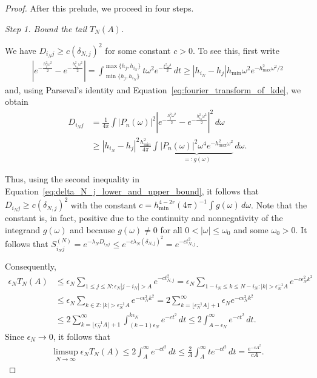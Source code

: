 \begin{proof}
    After this prelude, we proceed in four steps.

    \textit{Step 1. Bound the tail $T_N(A)$.}

    We have $D_{i_Nj}\ge c(\delta_{N,j})^2$ for some constant $c>0$. To see this, first write
    \begin{align*}
        \left|e^{-\frac{h_j^2\omega^2}{2}}-e^{-\frac{h_{i_N}^2\omega^2}{2}}\right|=\int_{\min\{h_j,h_{i_N}\}}^{\max\{h_j,h_{i_N}\}}t\omega^2e^{-\frac{t^2\omega^2}{2}}\,dt\ge|h_{i_N}-h_j|h_{\min}\omega^2e^{-h_{\max}^2\omega^2/2}
    \end{align*}
    and, using Parseval's identity and Equation~\eqref{eq:fourier_transform_of_kde}, we obtain
    \begin{align*}
        D_{i_Nj}&=\frac{1}{4\pi}\int|P_n(\omega)|^2\left|e^{-\frac{h_j^2\omega^2}{2}}-e^{-\frac{h_{i_N}^2\omega^2}{2}}\right|^2\,d\omega\\&
        \ge|h_{i_N}-h_j|^2\frac{h_{\min}^2}{4\pi}\int\underbrace{|P_n(\omega)|^2\omega^4e^{-h_{\max}^2\omega^2}}_{=:g(\omega)}\,d\omega.
    \end{align*}
    
    Thus, using the second inequality in Equation~\eqref{eq:delta_N_j_lower_and_upper_bound}, it follows that $D_{i_Nj}\ge c(\delta_{N,j})^2$ with the constant $c=h_{\min}^{4-2r}(4\pi)^{-1}\int g(\omega)\,d\omega$. Note that the constant is, in fact, positive due to the continuity and nonnegativity of the integrand $g(\omega)$ and because $g(\omega)\ne0$ for all $0<|\omega|\le\omega_0$ and some $\omega_0>0$. It follows that $S_{i_Nj}^{(N)}=e^{-\lambda_ND_{i_Nj}}\le e^{-c\lambda_N(\delta_{N,j})^2}=e^{-ct_{N,j}^2}$.

    Consequently,
    \begin{equation}\label{eq:tail_bound}
        \begin{aligned}
            \epsilon_NT_N(A)&\le\epsilon_N\sum_{1\le j\le N:\epsilon_N|j-i_N|>A}e^{-ct_{N,j}^2}=\epsilon_N\sum_{1-i_N\le k\le N-i_N:|k|>\epsilon_N^{-1}A}e^{-c\epsilon_N^2k^2}\\&
            \le\epsilon_N\sum_{k\in\mathbb{Z}:|k|>\epsilon_N^{-1}A}e^{-c\epsilon_N^2k^2}=2\sum_{k=\lfloor\epsilon_N^{-1}A\rfloor+1}^{\infty}\epsilon_Ne^{-c\epsilon_N^2k^2}\\&
            \le2\sum_{k=\lfloor\epsilon_N^{-1}A\rfloor+1}^{\infty}\int_{(k-1)\epsilon_N}^{k\epsilon_N}e^{-ct^2}\,dt\le2\int_{A-\epsilon_N}^{\infty}e^{-ct^2}\,dt.
        \end{aligned}
    \end{equation}
    Since $\epsilon_N\to0$, it follows that
    \begin{align*}
        \limsup_{N\to\infty}\epsilon_NT_N(A)\le2\int_{A}^{\infty}e^{-ct^2}\,dt\le\frac{2}{A}\int_A^{\infty}te^{-ct^2}\,dt=\frac{e^{-cA^2}}{cA}.
    \end{align*}


\end{proof}
